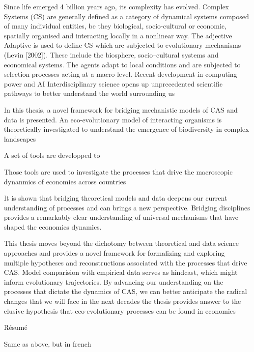%
\label{sec:summary}

\begin{outline}
    \1 Since life emerged 4 billion years ago, its complexity has evolved.
        \2 Complex Systems (CS) are generally defined as a category of dynamical systems composed of many individual entities, be they biological, socio-cultural or economic, spatially organised and interacting locally in a nonlinear way. The adjective Adaptive is used to define CS which are subjected to evolutionary mechanisms (Levin [2002]). These include the biosphere, socio--cultural systems and economical systems. The agents adapt to local conditions and are subjected to selection processes acting at a macro level.
        \2 Recent development 
            \3 in computing power and AI 
            \3 Interdisciplinary science
            \3 opens up unprecedented scientific pathways to better understand the world surrounding us
    
    \1 In this thesis, a novel framework for bridging mechanistic models of CAS and data is presented.
        \2 An eco-evolutionary model of interacting organisms is theoretically investigated 
            \3 to understand the emergence of biodiversity in complex landscapes

        \2 A set of tools are developped to 
        
        \2 Those tools are used to investigate the processes that drive the macroscopic dynanmics of economies across countries

    \1 It is shown that bridging theoretical models and data deepens our current understanding of processes and can brings a new perspective.
        \2 Bridging disciplines provides a remarkably clear understanding of universal mechanisms that have shaped the economics dynamics.

    \1 This thesis moves beyond the dichotomy between theoretical and data science approaches and provides a novel framework for formalizing and exploring multiple hypotheses and reconstructions associated with the processes that drive CAS. Model comparision with empirical data serves as hindcast, which might inform evolutionary trajectories. By advancing our understanding on the processes that dictate the dynamics of CAS, we can better anticipate the radical changes that we will face in the next decades
        \2 the thesis provides answer to the elusive hypothesis that eco-evolutionary processes can be found in economics

\end{outline}


{ Résumé}
\label{sec:summary-fr}

\begin{outline}
    \1 Same as above, but in french
\end{outline}